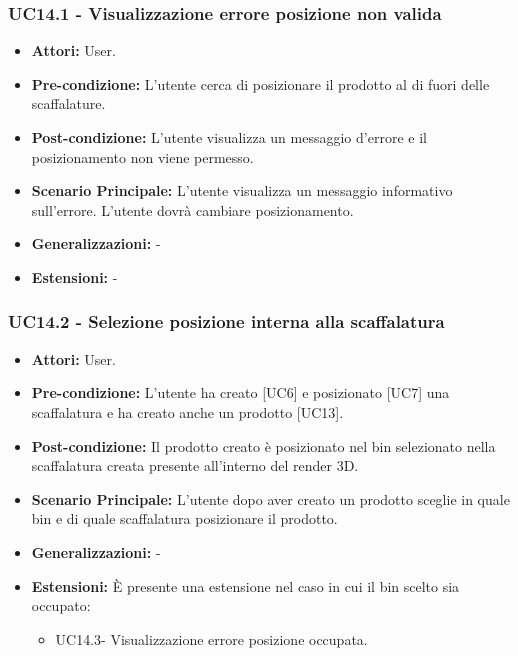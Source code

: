 \subsubsection{UC14.1 - Visualizzazione errore posizione non valida}
\begin{itemize}
    \item \textbf{Attori:} User.
    \item \textbf{Pre-condizione:}  L'utente cerca di posizionare il prodotto al di fuori delle scaffalature.
    \item \textbf{Post-condizione:} L'utente visualizza un messaggio d'errore e il posizionamento non viene permesso.
    \item \textbf{Scenario Principale:} L'utente visualizza un messaggio informativo sull'errore. L'utente dovrà cambiare posizionamento.
    \item \textbf{Generalizzazioni:} -
    \item \textbf{Estensioni:} -
\end{itemize}


\subsubsection{UC14.2 - Selezione posizione interna alla scaffalatura}
\begin{itemize}
    \item \textbf{Attori:} User.
    \item \textbf{Pre-condizione:}  L'utente ha creato [UC6] e posizionato [UC7] una scaffalatura e ha creato anche un prodotto [UC13]. 
    \item \textbf{Post-condizione:} Il prodotto creato è posizionato nel bin selezionato nella scaffalatura creata presente all'interno del render 3D.
    \item \textbf{Scenario Principale:} L'utente dopo aver creato un prodotto sceglie in quale bin e di quale scaffalatura posizionare il prodotto.
    \item \textbf{Generalizzazioni:} -
    \item \textbf{Estensioni:} È presente una estensione nel caso in cui il bin scelto sia occupato:
    \begin{itemize}
        \item UC14.3- Visualizzazione errore posizione occupata.
    \end{itemize}
\end{itemize}


